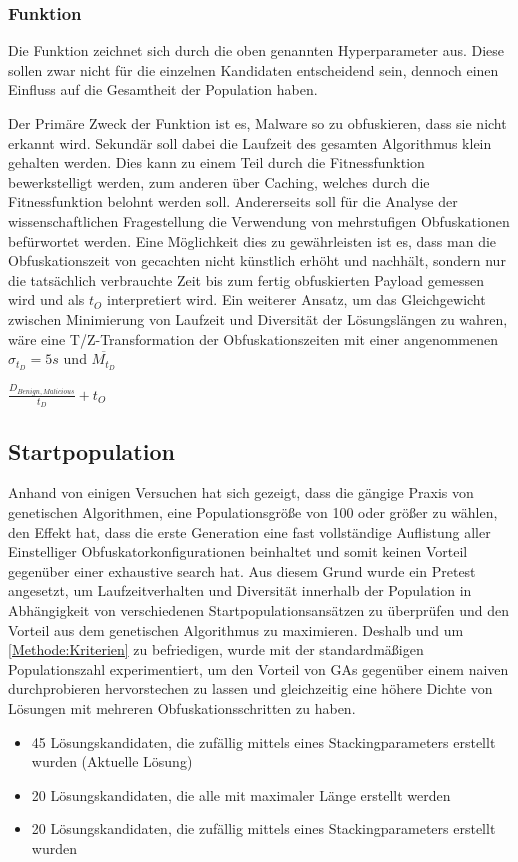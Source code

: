 \subsubsection{Funktion}
Die Funktion zeichnet sich durch die oben genannten Hyperparameter aus. Diese sollen zwar nicht für die einzelnen Kandidaten entscheidend sein, dennoch einen Einfluss auf die Gesamtheit der Population haben.

Der Primäre Zweck der Funktion ist es, Malware so zu obfuskieren, dass sie nicht erkannt wird. Sekundär soll dabei die Laufzeit des gesamten Algorithmus klein gehalten werden. Dies kann zu einem Teil durch die Fitnessfunktion bewerkstelligt werden, zum anderen über Caching, welches durch die Fitnessfunktion belohnt werden soll. Andererseits soll für die Analyse der wissenschaftlichen Fragestellung die Verwendung von mehrstufigen Obfuskationen befürwortet werden. Eine Möglichkeit dies zu gewährleisten ist es, dass man die Obfuskationszeit von gecachten nicht künstlich erhöht und nachhält, sondern nur die tatsächlich verbrauchte Zeit bis zum fertig obfuskierten Payload gemessen wird und als $t_O$ interpretiert wird.
Ein weiterer Ansatz, um das Gleichgewicht zwischen Minimierung von Laufzeit und Diversität der Lösungslängen zu wahren, wäre eine T/Z-Transformation der Obfuskationszeiten mit einer angenommenen $\sigma _{t_D}=5s$ und $\overline{M_{t_D}}$

$\frac{D_{Benign, Malicious}}{t_D}+t_O$

\subsection{Startpopulation} \label{GA:inital_population}
Anhand von einigen Versuchen hat sich gezeigt, dass die gängige Praxis von genetischen Algorithmen, eine Populationsgröße von 100 oder größer zu wählen, den Effekt hat, dass die erste Generation eine fast vollständige Auflistung aller Einstelliger Obfuskatorkonfigurationen beinhaltet und somit keinen Vorteil gegenüber einer exhaustive search hat. Aus diesem Grund wurde ein Pretest angesetzt, um Laufzeitverhalten und Diversität innerhalb der Population in Abhängigkeit von verschiedenen Startpopulationsansätzen zu überprüfen und den Vorteil aus dem genetischen Algorithmus zu maximieren.
Deshalb und um \ref{Methode:Kriterien} zu befriedigen, wurde mit der standardmäßigen Populationszahl experimentiert, um den Vorteil von GAs gegenüber einem naiven durchprobieren hervorstechen zu lassen und gleichzeitig eine höhere Dichte von Lösungen mit mehreren Obfuskationsschritten zu haben.
\begin{itemize}
    \item 45 Lösungskandidaten, die zufällig mittels eines Stackingparameters erstellt wurden (Aktuelle Lösung)
    \item 20 Lösungskandidaten, die alle mit maximaler Länge erstellt werden
    \item 20 Lösungskandidaten, die zufällig mittels eines Stackingparameters erstellt wurden
\end{itemize}
